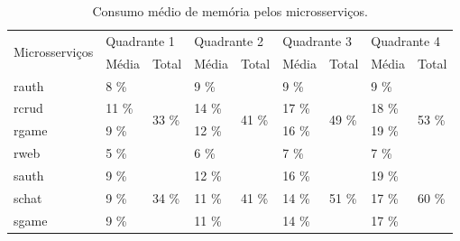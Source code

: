 \begin{table}[htb!]
\centering
\begin{adjustbox}{max width=\textwidth}
\caption{Consumo médio de memória pelos microsserviços.}
\label{tab:mem_gs_media}

\begin{tabular}{l|l|l|l|l|l|l|l|l}
\hline
\hline
\multirow{2}{*}{Microsserviços} & \multicolumn{2}{l|}{Quadrante 1} & \multicolumn{2}{l|}{Quadrante 2} & \multicolumn{2}{l|}{Quadrante 3} & \multicolumn{2}{l}{Quadrante 4} \\ \cline{2-9}
                                & Média  & Total                   & Média  & Total                   & Média  & Total                   & Média  & Total                   \\ \hline \hline
rauth                           & 8 \%   & \multirow{4}{*}{33 \%}  & 9 \%   & \multirow{4}{*}{41 \%}  & 9 \%   & \multirow{4}{*}{49 \%}  & 9 \%   & \multirow{4}{*}{53 \%}  \\ \cline{1-2} \cline{4-4} \cline{6-6} \cline{8-8}
rcrud                           & 11 \%  &                         & 14 \%  &                         & 17 \%  &                         & 18 \%  &                         \\ \cline{1-2} \cline{4-4} \cline{6-6} \cline{8-8}
rgame                           & 9 \%   &                         & 12 \%  &                         & 16 \%  &                         & 19 \%  &                         \\ \cline{1-2} \cline{4-4} \cline{6-6} \cline{8-8}
rweb                            & 5 \%   &                         & 6 \%   &                         & 7 \%   &                         & 7 \%   &                         \\ \hline \hline
sauth                           & 9 \%   & \multirow{4}{*}{34 \%}  & 12 \%  & \multirow{4}{*}{41 \%}  & 16 \%  & \multirow{4}{*}{51 \%}  & 19 \%  & \multirow{4}{*}{60 \%}  \\ \cline{1-2} \cline{4-4} \cline{6-6} \cline{8-8}
schat                           & 9 \%   &                         & 11 \%  &                         & 14 \%  &                         & 17 \%  &                         \\ \cline{1-2} \cline{4-4} \cline{6-6} \cline{8-8}
sgame                           & 9 \%   &                         & 11 \%  &                         & 14 \%  &                         & 17 \%  &                         \\ \cline{1-2} \cline{4-4} \cline{6-6} \cline{8-8}

\end{tabular}
\end{adjustbox}
\end{table}
